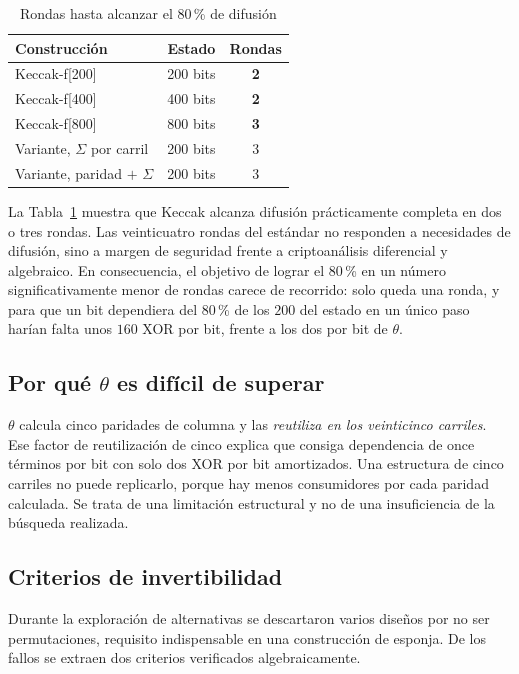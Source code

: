 \documentclass[conference]{IEEEtran}
\begin{document}
\begin{table}[t]
\caption{Rondas hasta alcanzar el 80\,\% de difusión}
\label{tab:dif}
\centering
\begin{tabular}{@{}lcc@{}}
\toprule
Construcción & Estado & Rondas \\
\midrule
Keccak-f[200]         & 200 bits & \textbf{2} \\
Keccak-f[400]         & 400 bits & \textbf{2} \\
Keccak-f[800]         & 800 bits & \textbf{3} \\
Variante, $\Sigma$ por carril    & 200 bits & 3 \\
Variante, paridad $+$ $\Sigma$   & 200 bits & 3 \\
\bottomrule
\end{tabular}
\end{table}

La Tabla~\ref{tab:dif} muestra que Keccak alcanza difusión prácticamente completa
en dos o tres rondas. Las veinticuatro rondas del estándar no responden a
necesidades de difusión, sino a margen de seguridad frente a criptoanálisis
diferencial y algebraico. En consecuencia, el objetivo de lograr el 80\,\% en un
número significativamente menor de rondas carece de recorrido: solo queda una
ronda, y para que un bit dependiera del 80\,\% de los $200$ del estado en un único
paso harían falta unos $160$ XOR por bit, frente a los dos por bit de $\theta$.

\subsection{Por qué $\theta$ es difícil de superar}

$\theta$ calcula cinco paridades de columna y las \emph{reutiliza en los
veinticinco carriles}. Ese factor de reutilización de cinco explica que consiga
dependencia de once términos por bit con solo dos XOR por bit amortizados. Una
estructura de cinco carriles no puede replicarlo, porque hay menos consumidores
por cada paridad calculada. Se trata de una limitación estructural y no de una
insuficiencia de la búsqueda realizada.

\subsection{Criterios de invertibilidad}

Durante la exploración de alternativas se descartaron varios diseños por no ser
permutaciones, requisito indispensable en una construcción de esponja. De los
fallos se extraen dos criterios verificados algebraicamente.
\end{document}
